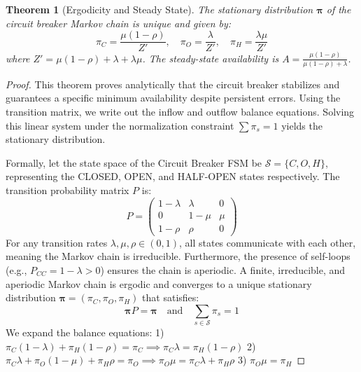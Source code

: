 \documentclass[11pt,a4paper]{article}
\theoremstyle{plain}
\newtheorem{theorem}{Theorem}[section]
\theoremstyle{definition}
\theoremstyle{remark}
\begin{document}
\begin{theorem}[Ergodicity and Steady State]\label{thm:cb}
The stationary distribution $\boldsymbol{\pi}$ of the circuit breaker Markov chain is unique and given by:
$$\pi_C = \frac{\mu(1-\rho)}{Z'}, \quad \pi_O = \frac{\lambda}{Z'}, \quad \pi_H = \frac{\lambda\mu}{Z'}$$
where $Z' = \mu(1-\rho) + \lambda + \lambda\mu$. The steady-state availability is $A = \frac{\mu(1-\rho)}{\mu(1-\rho) + \lambda}$.
\end{theorem}
\begin{proof}
This theorem proves analytically that the circuit breaker stabilizes and guarantees a specific minimum availability despite persistent errors. Using the transition matrix, we write out the inflow and outflow balance equations. Solving this linear system under the normalization constraint $\sum \pi_s = 1$ yields the stationary distribution.

Formally, let the state space of the Circuit Breaker FSM be $\mathcal{S} = \{C, O, H\}$, representing the CLOSED, OPEN, and HALF-OPEN states respectively. The transition probability matrix $P$ is:
$$P = \begin{pmatrix}
1 - \lambda & \lambda & 0 \\
0 & 1 - \mu & \mu \\
1 - \rho & \rho & 0
\end{pmatrix}$$
For any transition rates $\lambda, \mu, \rho \in (0, 1)$, all states communicate with each other, meaning the Markov chain is irreducible. Furthermore, the presence of self-loops (e.g., $P_{CC} = 1-\lambda > 0$) ensures the chain is aperiodic. A finite, irreducible, and aperiodic Markov chain is ergodic and converges to a unique stationary distribution $\boldsymbol{\pi} = (\pi_C, \pi_O, \pi_H)$ that satisfies:
$$\boldsymbol{\pi} P = \boldsymbol{\pi} \quad \text{and} \quad \sum_{s \in \mathcal{S}} \pi_s = 1$$
We expand the balance equations:
1) $\pi_C (1-\lambda) + \pi_H (1-\rho) = \pi_C \implies \pi_C \lambda = \pi_H (1-\rho)$
2) $\pi_C \lambda + \pi_O (1-\mu) + \pi_H \rho = \pi_O \implies \pi_O \mu = \pi_C \lambda + \pi_H \rho$
3) $\pi_O \mu = \pi_H$


\end{proof}
\end{document}
